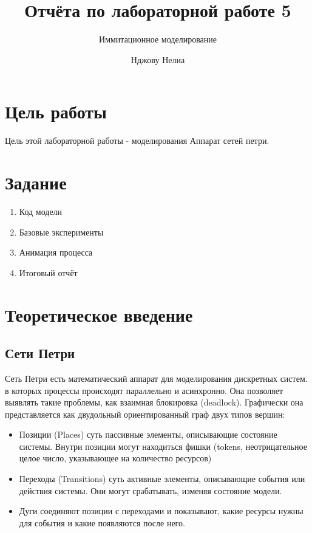 \documentclass[
  12pt,
  a4paper,
  DIV=11,
  numbers=noendperiod]{scrreprt}
\title{Отчёта по лабораторной работе 5}
\subtitle{Иммитационное моделирование}
\author{Нджову Нелиа}
\date{}
\renewcommand*\contentsname{Содержание}
\newcommand\contentsname{Содержание}
\begin{document}
\maketitle

\renewcommand*\contentsname{Содержание}
{
\setcounter{tocdepth}{1}
\tableofcontents
}
\listoffigures
\listoftables
{}
\chapter{Цель
работы}\label{ux446ux435ux43bux44c-ux440ux430ux431ux43eux442ux44b}

Цель этой лабораторной работы - моделирования Аппарат сетей петри.

\chapter{Задание}\label{ux437ux430ux434ux430ux43dux438ux435}

\begin{enumerate}
\def\labelenumi{\arabic{enumi}.}
\item
  Код модели
\item
  Базовые эксперименты
\item
  Анимация процесса
\item
  Итоговый отчёт
\end{enumerate}

\chapter{Теоретическое
введение}\label{ux442ux435ux43eux440ux435ux442ux438ux447ux435ux441ux43aux43eux435-ux432ux432ux435ux434ux435ux43dux438ux435}

\section{Сети
Петри}\label{ux441ux435ux442ux438-ux43fux435ux442ux440ux438}

Сеть Петри есть математический аппарат для моделирования дискретных
систем. в которых процессы происходят параллельно и асинхронно. Она
позволяет выявлять такие проблемы, как взаимная блокировка (deadlock).
Графически она представляется как двудольный ориентированный граф двух
типов вершин:

\begin{itemize}
\item
  Позиции (Places) суть пассивные элементы, описывающие состояние
  системы. Внутри позиции могут находиться фишки (tokens,
  неотрицательное целое число, указывающее на количество ресурсов)
\item
  Переходы (Transitions) суть активные элементы, описывающие события или
  действия системы. Они могут срабатывать, изменяя состояние модели.
\item
  Дуги соединяют позиции с переходами и показывают, какие ресурсы нужны
  для события и какие появляются после него.
\end{itemize}
\end{document}

